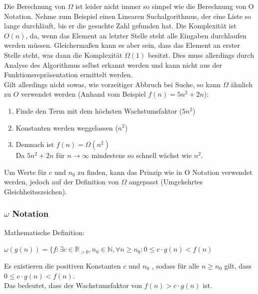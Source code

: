 \documentclass[
../AuD-Zusammenfassung.tex,
]
{subfiles}
\begin{document}
Die Berechnung von $\Omega$ ist leider nicht immer so simpel wie die Berechnung von O Notation. Nehme zum Beispiel einen Linearen Suchalgorithmus, der eine Liste so lange durchläuft, bis er die gesuchte Zahl gefunden hat. Die Komplexität ist $O(n)$, da, wenn das Element an letzter Stelle steht alle Eingaben durchlaufen werden müssen. Gleichermaßen kann es aber sein, dass das Element an erster Stelle steht, was dann die Komplexität $\Omega(1)$ besitzt. Dies muss allerdings durch Analyse des Algorithmus selbst erkannt werden und kann nicht aus der Funktionsrepräsentation ermittelt werden.\\
Gilt allerdings nicht sowas, wie vorzeitiger Abbruch bei Suche, so kann $\Omega$ ähnlich zu $O$ verwendet werden (Anhand vom Beispiel $f(n) = 5n^2 + 2n$):
\begin{enumerate}
    \item Finde den Term mit dem höchsten Wachstumsfaktor ($5n^2$)
    \item Konstanten werden weggelassen ($n^2$)
    \item Demnach ist $f(n) = \Omega(n^2)$\\
    Da $5n^2 + 2n$ für $n \to \infty$ mindestens so schnell wächst wie $n^2$.
\end{enumerate}
Um Werte für $c$ und $n_0$ zu finden, kann das Prinzip wie in O Notation verwendet werden, jedoch auf der Definition von $\Omega$ angepasst (Umgekehrtes Gleichheitsszeichen).
\newpage
\subsubsection{$\omega$ Notation}
Mathematische Definition:
\begin{center}
    $\omega(g(n)) = \{f: \exists c \in \mathbb{R}_{>0}, n_0 \in \mathbb{N}, \forall n \geq n_0:  0 \leq c \cdot g(n) < f(n)$
\end{center}
Es existieren die positiven Konstanten $c$ und $n_0$ , sodass für alle $n \geq n_0$ gilt, dass  $0 \leq c \cdot g(n) < f(n)$. \\
Das bedeutet, dass der Wachstumsfaktor von $f(n) > c \cdot g(n)$ ist. \\
\end{document}
